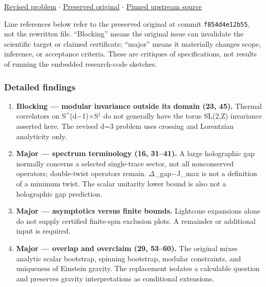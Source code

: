 \documentclass[
  11pt,
]{article}
\begin{document}
\href{https://github.com/rick-stevens-ai/Pure-Thought/blob/main/PRDs/04-Modular-Lightcone-Bootstrap.md}{Revised
problem} \ensuremath{\cdot}
\href{https://github.com/rick-stevens-ai/Pure-Thought/blob/main/archive/original-PRDs/04-Modular-Lightcone-Bootstrap.md}{Preserved
original} \ensuremath{\cdot}
\href{https://github.com/rick-stevens-ai/Pure-Thought/blob/f854d4e12b55c1f5b5c2a964b75f2d23496d981e/PRDs/04-Modular-Lightcone-Bootstrap.md}{Pinned
upstream source}

Line references below refer to the preserved original at commit
\texttt{f854d4e12b55}, not the rewritten file. ``Blocking'' means the
original issue can invalidate the scientific target or claimed
certificate; ``major'' means it materially changes scope, inference, or
acceptance criteria. These are critiques of specifications, not results
of running the embedded research-code sketches.

\subsubsection{Detailed findings}

\begin{enumerate}
\def\labelenumi{\arabic{enumi}.}
\item
  \textbf{Blocking --- modular invariance outside its domain (23, 45).}
  Thermal correlators on
  S\textasciicircum{}(d\ensuremath{-}1)\ensuremath{\times}S\ensuremath{{}^{1}}
  do not generally have the torus SL(2,Z) invariance asserted here. The
  revised d=3 problem uses crossing and Lorentzian analyticity only.
\item
  \textbf{Major --- spectrum terminology (16, 31--41).} A large
  holographic gap normally concerns a selected single-trace sector, not
  all nonconserved operators; double-twist operators remain.
  \ensuremath{\Delta}\_gap\ensuremath{-}J\_max is not a definition of a
  minimum twist. The scalar unitarity lower bound is also not a
  holographic gap prediction.
\item
  \textbf{Major --- asymptotics versus finite bounds.} Lightcone
  expansions alone do not supply certified finite-spin exclusion plots.
  A remainder or additional input is required.
\item
  \textbf{Major --- overlap and overclaim (29, 53--60).} The original
  mixes analytic scalar bootstrap, spinning bootstrap, modular
  constraints, and uniqueness of Einstein gravity. The replacement
  isolates a calculable question and preserves gravity interpretations
  as conditional extensions.
\end{enumerate}
\end{document}
